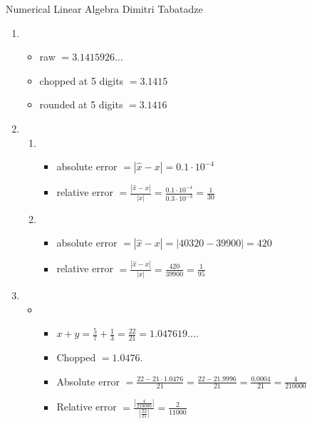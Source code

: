 \documentclass{article}
\begin{document}
    {Numerical Linear Algebra}
    {Dimitri Tabatadze}

    \begin{enumerate}
        \item {
            \begin{itemize}
                \item raw \( = 3.1415926\dots\)
                \item chopped at 5 digits \(= 3.1415\)
                \item rounded at 5 digits \(= 3.1416\)
            \end{itemize}
        }
        \item {
            \begin{enumerate}
                \item {
                    \begin{itemize}
                        \item absolute error \(= |\hat{x} - x| = 0.1\cdot10^{-4}\)
                        \item relative error \(= \frac{|\hat{x} - x|}{|x|} = \frac{0.1\cdot10^{-4}}{0.3\cdot10^{-3}} = \frac{1}{30}\)
                    \end{itemize}
                }
                \item {
                    \begin{itemize}
                        \item absolute error \(= |\hat{x} - x| = |40320 - 39900| = 420\) %
                        \item relative error \(= \frac{|\hat{x} - x|}{|x|} = \frac{420}{39900} = \frac{1}{95}\)
                    \end{itemize}
                }
            \end{enumerate}
        }
        \item {
            \begin{itemize}
                \item \begin{itemize}
                    \item \(x+y = \frac{5}{7} + \frac{1}{3} = \frac{22}{21} = 1.047619\dots\).
                    \item Chopped \(= 1.0476\).
                    \item Absolute error \(= \frac{22-21\cdot1.0476}{21} = \frac{22-21.9996}{21} = \frac{0.0004}{21} = \frac{4}{210000}\)
                    \item Relative error \(= \frac{|\frac{4}{210000}|}{|\frac{22}{21}|} = \frac{2}{11000}\)

\end{itemize}
\end{itemize}}
\end{enumerate}
\end{document}
